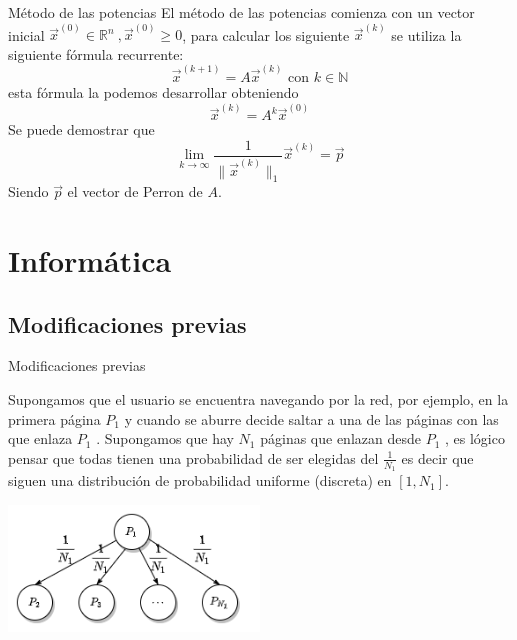 \documentclass[ignorenonframetext,aspectratio=43,]{beamer}
\begin{document}
\begin{frame}{Método de las potencias}
El método de las potencias comienza con un vector inicial $\vec{x}^{(0)} \in \mathbb{R}^n  \ , \vec{x}^{(0)} \geq 0$, para calcular los siguiente $\vec{x}^{(k)}$ se utiliza la siguiente fórmula recurrente:
$$\vec{x}^{(k+1)} = A \vec{x}^{(k)} \textrm{ con } k \in \mathbb{N}$$ esta fórmula la podemos desarrollar obteniendo  $$\vec{x}^{(k)} = A^k \vec{x}^{(0)}$$
Se puede demostrar que
$$\lim_{k \to \infty} \frac{1}{\|\vec{x}^{(k)}\|_1} \vec{x}^{(k)} = \vec{p} $$
Siendo $\vec{p}$ el vector de Perron de $A$.
\end{frame}


\section{Informática}

\subsection{Modificaciones previas}
\begin{frame}{Modificaciones previas}

Supongamos que el usuario se encuentra navegando por la red, por ejemplo, en la primera página $P_1$ y cuando se aburre decide saltar a una de las páginas con las que enlaza $P_1$ . Supongamos que hay $N_1$ páginas que enlazan desde $P_1$ , es lógico pensar que todas tienen una probabilidad de ser elegidas del $\frac{1}{N_1}$ es decir que siguen una distribución de probabilidad uniforme (discreta) en $[ 1, N_1 ]$.
\begin{center}
\includegraphics[width=0.5\textwidth]{./img/grafoprobini}

\end{center}
\end{frame}
\end{document}
